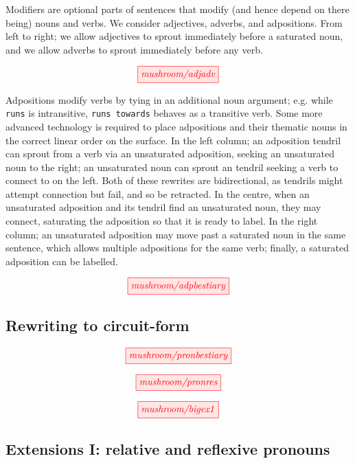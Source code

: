 Modifiers are optional parts of sentences that modify (and hence depend on there being) nouns and verbs. We consider adjectives, adverbs, and adpositions. From left to right; we allow adjectives to sprout immediately before a saturated noun, and we allow adverbs to sprout immediately before any verb.

\[
\tikzfig{mushroom/adjadv}
\]

Adpositions modify verbs by tying in an additional noun argument; e.g. while \texttt{runs} is intransitive, \texttt{runs towards} behaves as a transitive verb. Some more advanced technology is required to place adpositions and their thematic nouns in the correct linear order on the surface. In the left column; an adposition tendril can sprout from a verb via an unsaturated adposition, seeking an unsaturated noun to the right; an unsaturated noun can sprout an tendril seeking a verb to connect to on the left. Both of these rewrites are bidirectional, as tendrils might attempt connection but fail, and so be retracted. In the centre, when an unsaturated adposition and its tendril find an unsaturated noun, they may connect, saturating the adposition so that it is ready to label. In the right column; an unsaturated adposition may move past a saturated noun in the same sentence, which allows multiple adpositions for the same verb; finally, a saturated adposition can be labelled.

\[
\tikzfig{mushroom/adpbestiary}
\]

\subsection{Rewriting to circuit-form}


\[
\tikzfig{mushroom/pronbestiary}
\]

\[
\tikzfig{mushroom/pronres}
\]

\[
\tikzfig{mushroom/bigex1}
\]


\begin{example}

\end{example}

\subsection{Extensions I: relative and reflexive pronouns}


